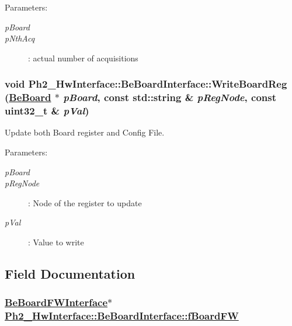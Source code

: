 \begin{Desc}
\item[Parameters:]
\begin{description}
\item[{\em p\-Board}]\item[{\em p\-Nth\-Acq}]: actual number of acquisitions \end{description}
\end{Desc}
\hypertarget{class_ph2___hw_interface_1_1_be_board_interface_dd92a5f30e058c3a384b8fde1015f31a}{
\subsubsection[WriteBoardReg]{\setlength{\rightskip}{0pt plus 5cm}void Ph2\_\-Hw\-Interface::Be\-Board\-Interface::Write\-Board\-Reg (\hyperlink{class_ph2___hw_description_1_1_be_board}{Be\-Board} $\ast$ {\em p\-Board}, const std::string \& {\em p\-Reg\-Node}, const uint32\_\-t \& {\em p\-Val})}}
\label{class_ph2___hw_interface_1_1_be_board_interface_dd92a5f30e058c3a384b8fde1015f31a}


Update both Board register and Config File. 

\begin{Desc}
\item[Parameters:]
\begin{description}
\item[{\em p\-Board}]\item[{\em p\-Reg\-Node}]: Node of the register to update \item[{\em p\-Val}]: Value to write \end{description}
\end{Desc}


\subsection{Field Documentation}
\hypertarget{class_ph2___hw_interface_1_1_be_board_interface_763c8be5545618fb5ca0dfe01667f9ae}{
\subsubsection[fBoardFW]{\setlength{\rightskip}{0pt plus 5cm}\hyperlink{class_ph2___hw_interface_1_1_be_board_f_w_interface}{Be\-Board\-FWInterface}$\ast$ \hyperlink{class_ph2___hw_interface_1_1_be_board_interface_763c8be5545618fb5ca0dfe01667f9ae}{Ph2\_\-Hw\-Interface::Be\-Board\-Interface::f\-Board\-FW}}}
\label{class_ph2___hw_interface_1_1_be_board_interface_763c8be5545618fb5ca0dfe01667f9ae}


